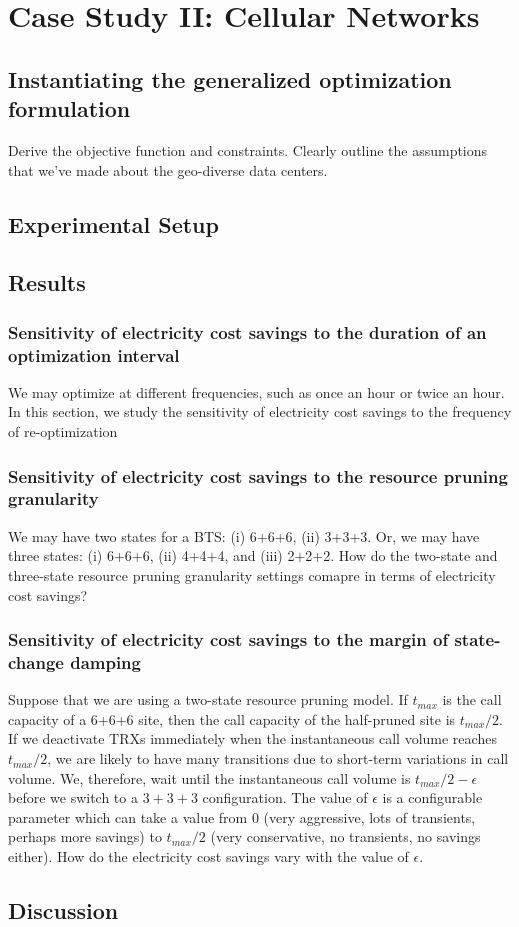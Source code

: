 \chapter{Case Study II: Cellular Networks}

\section{Instantiating the generalized optimization formulation} Derive the objective function and constraints. Clearly outline the assumptions that we've made about the geo-diverse data centers.

\section{Experimental Setup} 

\section{Results}
\subsection{Sensitivity of electricity cost savings to the duration of an optimization interval} We may optimize at different frequencies, such as once an hour or twice an hour. In this section, we study the sensitivity of electricity cost savings to the frequency of re-optimization
\subsection{Sensitivity of electricity cost savings to the resource pruning granularity} We may have two states for a BTS: (i) 6+6+6, (ii) 3+3+3. Or, we may have three states: (i) 6+6+6, (ii) 4+4+4, and (iii) 2+2+2. How do the two-state and three-state resource pruning granularity settings comapre in terms of electricity cost savings? 
\subsection{Sensitivity of electricity cost savings to the margin of state-change damping} Suppose that we are using a two-state resource pruning model. If $t_{max}$ is the call capacity of a 6+6+6 site, then the call capacity of the half-pruned site is $t_{max}/2$. If we deactivate TRXs immediately when the instantaneous call volume reaches $t_{max}/2$, we are likely to have many transitions due to short-term variations in call volume. We, therefore, wait until the instantaneous call volume is $t_{max}/2 - \epsilon$ before we switch to a $3+3+3$ configuration. The value of $\epsilon$ is a configurable parameter which can take a value from $0$ (very aggressive, lots of transients, perhaps more savings) to $t_{max}/2$ (very conservative, no transients, no savings either). How do the electricity cost savings vary with the value of $\epsilon$.

\section{Discussion}